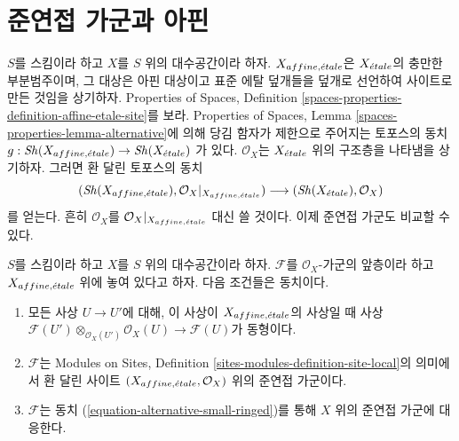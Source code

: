 \section{준연접 가군과 아핀}
\label{section-alternative-quasi-coherent}

\noindent
$S$를 스킴이라 하고 $X$를 $S$ 위의 대수공간이라 하자.
$X_{affine, {\acute{e}tale}}$은 $X_{\acute{e}tale}$의 충만한 부분범주이며, 그 대상은 아핀
대상이고 표준 에탈 덮개들을 덮개로 선언하여 사이트로 만든 것임을
상기하자. Properties of Spaces, Definition
\ref{spaces-properties-definition-affine-etale-site}를 보라. Properties of
Spaces, Lemma \ref{spaces-properties-lemma-alternative}에 의해 당김 함자가
제한으로 주어지는 토포스의 동치
$g : \mathop{\mathit{Sh}}\nolimits(X_{affine, {\acute{e}tale}}) \to \mathop{\mathit{Sh}}\nolimits(X_{\acute{e}tale})$
가 있다. $\mathcal{O}_X$는 $X_{\acute{e}tale}$ 위의 구조층을 나타냄을 상기하자.
그러면 환 달린 토포스의 동치
\begin{equation}
\label{equation-alternative-small-ringed}
(\mathop{\mathit{Sh}}\nolimits(X_{affine, {\acute{e}tale}}), \mathcal{O}_X|_{X_{affine, {\acute{e}tale}}})
\longrightarrow
(\mathop{\mathit{Sh}}\nolimits(X_{\acute{e}tale}), \mathcal{O}_X)
\end{equation}
를 얻는다. 흔히 $\mathcal{O}_X$를
$\mathcal{O}_X|_{X_{affine, {\acute{e}tale}}}$ 대신 쓸 것이다.
이제 준연접 가군도 비교할 수 있다.

\begin{lemma}
\label{lemma-quasi-coherent-alternative-small}
$S$를 스킴이라 하고 $X$를 $S$ 위의 대수공간이라 하자.
$\mathcal{F}$를 $\mathcal{O}_X$-가군의 앞층이라 하고
$X_{affine, {\acute{e}tale}}$ 위에 놓여 있다고 하자. 다음 조건들은 동치이다.
\begin{enumerate}
\item 모든 사상 $U\to U'$에 대해, 이 사상이 $X_{affine, {\acute{e}tale}}$의
사상일 때 사상
$\mathcal{F}(U') \otimes_{\mathcal{O}_X(U')} \mathcal{O}_X(U)
\to \mathcal{F}(U)$가 동형이다.
\item $\mathcal{F}$는 Modules on Sites, Definition
\ref{sites-modules-definition-site-local}의 의미에서 환 달린 사이트
$(X_{affine, {\acute{e}tale}}, \mathcal{O}_X)$ 위의 준연접 가군이다.
\item $\mathcal{F}$는 동치 (\ref{equation-alternative-small-ringed})를 통해
$X$ 위의 준연접 가군에 대응한다.
\end{enumerate}
\end{lemma}

